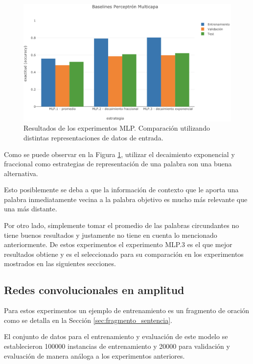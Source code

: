 \begin{figure}[t]
\begin{center}
\includegraphics[width=.9\linewidth]{images/MLP_baselines.png}
\caption{Resultados de los experimentos MLP. Comparación utilizando distintas representaciones de datos de 
entrada.}
\label{fig:MLPbaselines}
\end{center}
\end{figure}

Como se puede observar en la Figura \ref{fig:MLPbaselines}, utilizar el decaimiento exponencial y fraccional 
como estrategias de representación de una palabra son una buena alternativa. 

Esto posiblemente se deba a que la información de contexto que le aporta una palabra inmediatamente vecina a 
la palabra objetivo es mucho más relevante que una más distante. 

Por otro lado, simplemente tomar el promedio de las palabras circundantes no tiene buenos resultados y 
justamente no tiene en cuenta lo mencionado anteriormente. De estos experimentos el experimento MLP.3 es el 
que mejor resultados obtiene y es el seleccionado para su comparación en los experimentos mostrados en las 
siguientes secciones.

\subsection{Redes convolucionales en amplitud}\label{baseline:cnn:wide}

Para estos experimentos un ejemplo de entrenamiento es un fragmento de oración como se detalla en la Sección 
\ref{sec:fragmento_sentencia}. 

El conjunto de datos para el entrenamiento y evaluación de este modelo se establecieron 100000 instancias de 
entrenamiento y 20000 para validación y evaluación de manera análoga a los experimentos anteriores. 

